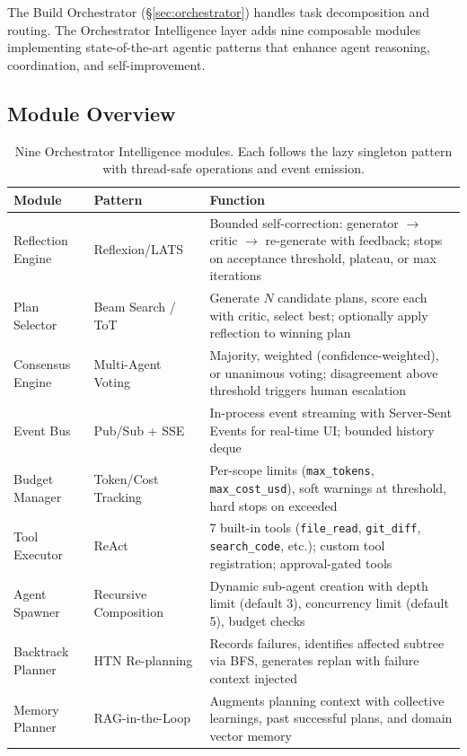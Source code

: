 \documentclass[11pt,a4paper]{article}
\begin{document}
The Build Orchestrator (\S\ref{sec:orchestrator}) handles task decomposition and routing. The Orchestrator Intelligence layer adds nine composable modules implementing state-of-the-art agentic patterns that enhance agent reasoning, coordination, and self-improvement.

\subsection{Module Overview}

\begin{table}[h]
\centering
\caption{Nine Orchestrator Intelligence modules. Each follows the lazy singleton pattern with thread-safe operations and event emission.}
\label{tab:orch_modules}
\begin{tabular}{llp{5.5cm}}
\toprule
\textbf{Module} & \textbf{Pattern} & \textbf{Function} \\
\midrule
Reflection Engine & Reflexion/LATS~\citep{shinn2023reflexion} & Bounded self-correction: generator $\rightarrow$ critic $\rightarrow$ re-generate with feedback; stops on acceptance threshold, plateau, or max iterations \\
Plan Selector & Beam Search / ToT & Generate $N$ candidate plans, score each with critic, select best; optionally apply reflection to winning plan \\
Consensus Engine & Multi-Agent Voting & Majority, weighted (confidence-weighted), or unanimous voting; disagreement above threshold triggers human escalation \\
Event Bus & Pub/Sub + SSE & In-process event streaming with Server-Sent Events for real-time UI; bounded history deque \\
Budget Manager & Token/Cost Tracking & Per-scope limits (\texttt{max\_tokens}, \texttt{max\_cost\_usd}), soft warnings at threshold, hard stops on exceeded \\
Tool Executor & ReAct~\citep{yao2023react} & 7 built-in tools (\texttt{file\_read}, \texttt{git\_diff}, \texttt{search\_code}, etc.); custom tool registration; approval-gated tools \\
Agent Spawner & Recursive Composition & Dynamic sub-agent creation with depth limit (default 3), concurrency limit (default 5), budget checks \\
Backtrack Planner & HTN Re-planning & Records failures, identifies affected subtree via BFS, generates replan with failure context injected \\
Memory Planner & RAG-in-the-Loop & Augments planning context with collective learnings, past successful plans, and domain vector memory \\
\bottomrule
\end{tabular}
\end{table}
\end{document}
